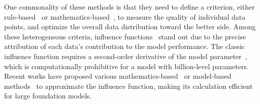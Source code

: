 One commonality of these methods is that they need to define a criterion, either rule-based~\cite{t5,wettig2024qurating} or mathematics-based~\cite{engstrom2024dsdm,yu2024mates}, to measure the quality of individual data points, and optimize the overall data distribution toward the better side. Among these heterogeneous criteria, influence functions~\cite{weisberg1982residuals,koh2017understanding} stand out due to the precise attribution of each data's contribution to the model performance. 
 The classic influence function requires a second-order derivative of the model parameter~\cite{koh2017understanding}, which is computationally prohibitive for a model with billion-level parameters. Recent works have proposed various mathematics-based~\cite{pruthi2020estimating,grosse2023studyinginfluence,park2023trak,choe2024your,wang2024greats,zhang2024quad} or model-based methods~\cite{ilyas2022datamodels,engstrom2024dsdm,yu2024mates,isonuma2024unlearning} to approximate the influence function, making its calculation efficient for large foundation models.



